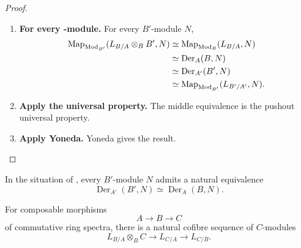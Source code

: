 \begin{proof}
\leavevmode
\begin{enumerate}[label=\textup{(\arabic*)}]
    \item \textbf{For every -module.}
    For every \(B'\)-module \(N\),
    \[
    \begin{aligned}
        \operatorname{Map}_{\operatorname{Mod}_{B'}}(L_{B/A}\otimes_BB',N)
        &\simeq
        \operatorname{Map}_{\operatorname{Mod}_B}(L_{B/A},N)
        \\
        &\simeq
        \operatorname{Der}_A(B,N)
        \\
        &\simeq
        \operatorname{Der}_{A'}(B',N)
        \\
        &\simeq
        \operatorname{Map}_{\operatorname{Mod}_{B'}}(L_{B'/A'},N).
    \end{aligned}
    \]

    \item \textbf{Apply the universal property.}
    The middle equivalence is the pushout universal property.

    \item \textbf{Apply Yoneda.}
    Yoneda gives the result.
\end{enumerate}
\end{proof}

\begin{corollary}
\label{cor:derivation-base-change}
In the situation of , every \(B'\)-module \(N\)
admits a natural equivalence
\[
    \operatorname{Der}_{A'}(B',N)
    \simeq
    \operatorname{Der}_A(B,N).
\]
\end{corollary}

\begin{theorem}
\label{thm:cotangent-transitivity}
For composable morphisms
\[
    A\longrightarrow B\longrightarrow C
\]
of commutative ring spectra, there is a natural cofibre sequence of
\(C\)-modules
\[
    L_{B/A}\otimes_BC
    \longrightarrow
    L_{C/A}
    \longrightarrow
    L_{C/B}.
\]
\end{theorem}

